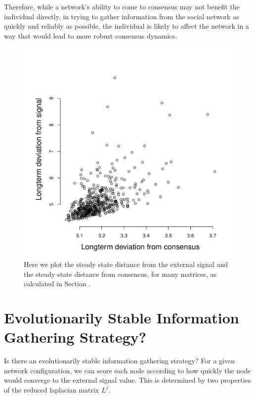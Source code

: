 \documentclass{article}
\begin{document}
Therefore, while a network's ability to come to consensus may not benefit the individual directly, in trying to gather information from the social network as quickly and reliably as possible, the individual is likely to affect the network in a way that would lead to more robust consensus dynamics.

\begin{figure}
\begin{center}
\includegraphics[width=.75\textwidth]{deviations.pdf}
\end{center}
\caption{\label{lyap_comparison} Here we plot the steady state distance from the external signal and the steady state distance from consensus, for many matrices, as calculated in Section .}
\end{figure}

\section{Evolutionarily Stable Information Gathering Strategy?}
Is there an evolutionarily stable information gathering strategy?  For a given network configuration, we can score each node according to how quickly the node would converge to the external signal value.  This is determined by two properties of the reduced laplacian matrix $L^j$.  
\end{document}
